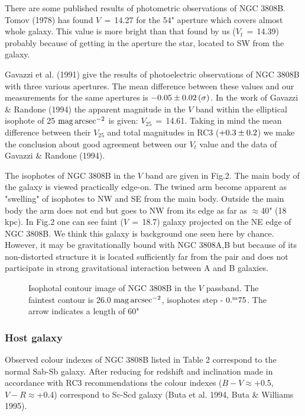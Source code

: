 There are some published results of photometric observations of NGC 3808B.
Tomov (1978) has found $V\,=\,$14.27 for the 54" aperture which covers
almost whole galaxy. This value is more bright than that found by us
($V_{t}\,=\,$14.39) probably because of getting in the aperture the
star, located to SW from the galaxy.

Gavazzi et al. (1991) give the results of photoelectric observations
of NGC 3808B with three various apertures. The mean difference
between these values and our measurements for the same apertures
is $\rm -0.05\pm0.02\,(\sigma)$. In the work of Gavazzi \& Randone (1994)
the apparent magnitude in the $V$ band within the elliptical
isophote of 25 $\rm mag\,arcsec^{-2}$ is given: $V_{25}\,=\,$14.61. Taking
in mind the mean difference between their $V_{25}$ and total magnitudes
in RC3 ($\rm +0.3\pm0.2$) we make the conclusion about good agreement 
between our $V_{t}$ value and the data of Gavazzi \& Randone (1994).

The isophotes of NGC 3808B in the $V$ band are given in Fig.2. The main
body of the galaxy is viewed practically edge-on. The twined arm become 
apparent
as "swelling" of isophotes to NW and SE from the main body. Outside
the main body the arm does not end but goes to NW from its edge
as far as $\approx$40" (18 kpc). In Fig.2 one can see faint ($V\,=\,$18.7)
galaxy projected on the NE edge of NGC 3808B. We think this galaxy
is background one seen here by chance. However, it may be
gravitationally bound with NGC 3808A,B but because of its non-distorted
structure it is located sufficiently far from the pair and does not
participate in strong gravitational interaction between A and B galaxies.

\begin{figure}
\picplace{1.5cm}
\caption[2]{Isophotal contour image of NGC 3808B in the $V$ passband.
The faintest contour is 26.0 $\rm mag\,arcsec^{-2}$, isophotes step -
$\rm 0.^{m}75$. The arrow indicates a length of 60"}
\end{figure}

\subsubsection{Host galaxy}

Observed colour indexes of NGC 3808B listed in Table 2 correspond to the
normal Sab-Sb galaxy. After reducing for redshift and inclination made
in accordance with RC3 recommendations the colour indexes ($B-V\approx$+0.5,
$V-R\approx$+0.4) correspond to Sc-Scd galaxy (Buta et al. 1994, 
Buta \& Williams 1995). 

